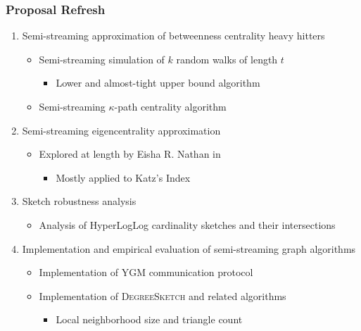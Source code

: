 \documentclass{beamer}
\newcommand{\algoname}[1]{\textnormal{\textsc{#1}}}
\begin{document}
\begin{frame}
\frametitle{Proposal Refresh}

\begin{enumerate}
	\item Semi-streaming approximation of betweenness centrality heavy hitters
	\begin{itemize}
		\item Semi-streaming simulation of $k$ random walks of length $t$
		\begin{itemize} 
			\item Lower and almost-tight upper bound algorithm
		\end{itemize}
		\item Semi-streaming $\kappa$-path centrality algorithm
	\end{itemize}
	\item Semi-streaming eigencentrality approximation 
	\begin{itemize}
		\item Explored at length by Eisha R. Nathan in \cite{nathan2018numerical}
		\begin{itemize}
			\item Mostly applied to Katz's Index
		\end{itemize}
	\end{itemize}
	\item Sketch robustness analysis 
	\begin{itemize}
		\item Analysis of HyperLogLog cardinality sketches and their intersections
	\end{itemize}
	\item Implementation and empirical evaluation of semi-streaming graph algorithms 
	\begin{itemize}
		\item Implementation of \algoname{YGM} communication protocol
		\item Implementation of \algoname{DegreeSketch} and related algorithms
		\begin{itemize}
			\item Local neighborhood size and triangle count 
		\end{itemize}
	\end{itemize}
\end{enumerate}


\end{frame}
\end{document}
